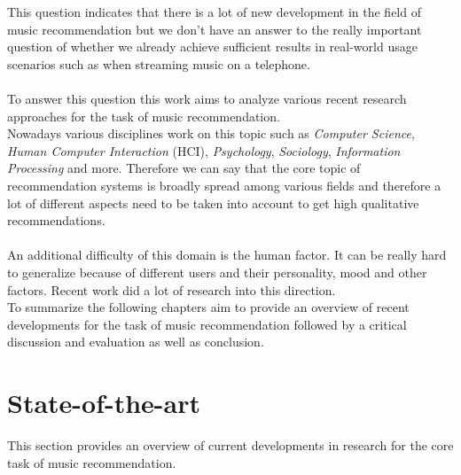 \documentclass[runningheads,a4paper]{llncs}
\begin{document}
This question indicates that there is a lot of new development in the field of music recommendation but we don't have an answer to the really important question of whether we already achieve 
sufficient results in real-world usage scenarios such as when streaming music on a telephone.\\
\\
To answer this question this work aims to analyze various recent research approaches for the task of music recommendation.\\
Nowadays various disciplines work on this topic such as \textit{Computer Science}, \textit{Human Computer Interaction} (HCI), 
\textit{Psychology}, \textit{Sociology}, \textit{Information Processing} and more. 
Therefore we can say that the core topic of recommendation systems is broadly spread among various fields and therefore 
a lot of different aspects need to be taken into account to get high qualitative recommendations. \\
\\
An additional difficulty of this domain is the human factor. It can be really hard to generalize because of 
different users and their personality, mood and other factors. Recent work did a lot of research into this direction.\\
To summarize the following chapters aim to provide an overview of recent developments for the task of music recommendation 
followed by a critical discussion and evaluation as well as conclusion. 
\section{State-of-the-art}
This section provides an overview of current developments in research for the core task of music recommendation. 
\end{document}

